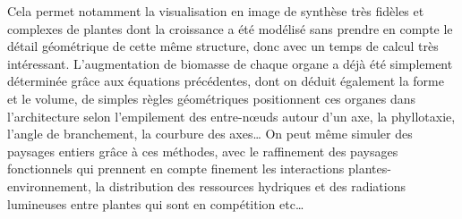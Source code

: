 Cela permet notamment la visualisation en image de synthèse très fidèles et complexes de plantes dont la croissance a été modélisé sans prendre en compte le détail géométrique de cette même structure, donc avec un temps de calcul très intéressant. L’augmentation de biomasse de chaque organe a déjà été simplement déterminée grâce aux équations précédentes, dont on déduit également la forme et le volume, de simples règles géométriques positionnent ces organes dans l’architecture selon l’empilement des entre-nœuds autour d’un axe, la phyllotaxie, l’angle de branchement, la courbure des axes… On peut même simuler des paysages entiers grâce à ces méthodes, avec le raffinement des paysages fonctionnels qui prennent en compte finement les interactions plantes-environnement, la distribution des ressources hydriques et des radiations lumineuses entre plantes qui sont en compétition etc…



